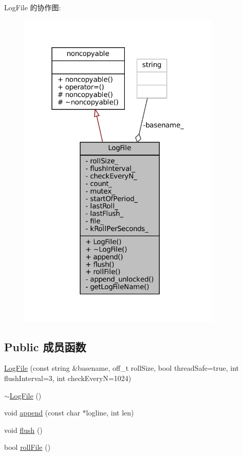 Log\+File 的协作图\+:
\nopagebreak
\begin{figure}[H]
\begin{center}
\leavevmode
\includegraphics[width=274pt]{classmuduo_1_1LogFile__coll__graph}
\end{center}
\end{figure}
\subsection*{Public 成员函数}
\begin{DoxyCompactItemize}
\item 
\hyperlink{classmuduo_1_1LogFile_a1d0d3a0ba969ef3f1471af62aed2f1f6}{Log\+File} (const string \&basename, off\+\_\+t roll\+Size, bool thread\+Safe=true, int flush\+Interval=3, int check\+EveryN=1024)
\item 
\hyperlink{classmuduo_1_1LogFile_a9789bd34990afddd14d01824e61da5bf}{$\sim$\+Log\+File} ()
\item 
void \hyperlink{classmuduo_1_1LogFile_a14dd7b692df8633d1e5053d3499a24d3}{append} (const char $\ast$logline, int len)
\item 
void \hyperlink{classmuduo_1_1LogFile_adac116554b543b7c4228c018a85882f5}{flush} ()
\item 
bool \hyperlink{classmuduo_1_1LogFile_a2bfc99f988c026eb098feccf974c607f}{roll\+File} ()
\end{DoxyCompactItemize}
